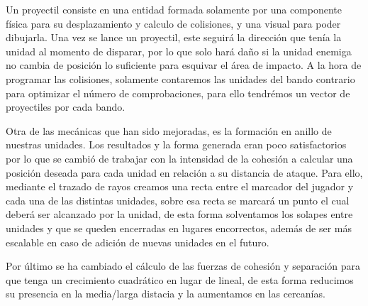 Un proyectil consiste en una entidad formada solamente por una componente física para su desplazamiento
y calculo de colisiones, y una visual para poder dibujarla. Una vez se lance un proyectil, este seguirá la
dirección que tenía la unidad al momento de disparar, por lo que solo hará daño si la unidad enemiga no 
cambia de posición lo suficiente para esquivar el área de impacto. A la hora de programar las colisiones,
solamente contaremos las unidades del bando contrario para optimizar el número de comprobaciones, para ello
tendrémos un vector de proyectiles por cada bando.


Otra de las mecánicas que han sido mejoradas, es la formación en anillo de nuestras unidades. Los resultados
y la forma generada eran poco satisfactorios por lo que se cambió de trabajar con la intensidad de la cohesión
a calcular una posición deseada para cada unidad en relación a su distancia de ataque. Para ello, mediante el
trazado de rayos creamos una recta entre el marcador del jugador y cada una de las distintas unidades, sobre esa
recta se marcará un punto el cual deberá ser alcanzado por la unidad, de esta forma solventamos los solapes entre
unidades y que se queden encerradas en lugares encorrectos, además de ser más escalable en caso de adición de
nuevas unidades en el futuro.

Por último se ha cambiado el cálculo de las fuerzas de cohesión y separación para que tenga un crecimiento
cuadrático en lugar de lineal, de esta forma reducimos su presencia en la media/larga distacia y la aumentamos
en las cercanías.   
